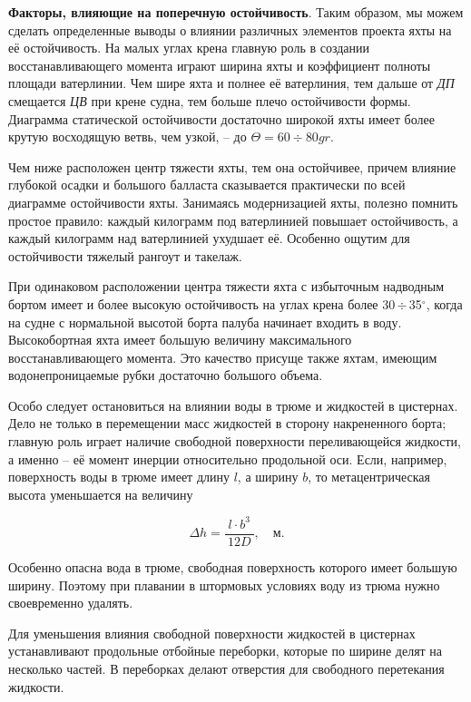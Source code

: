 \documentclass[a4paper, 12pt, twoside, final, book, russian, fittopage, cyremdash]{ncc}
\newcommand{\gr}{\ensuremath{^\circ}\xspace}
\newcommand{\otdo}{\,\ensuremath{\div}\,}
\newcommand{\motdo}{\div}
\begin{document}
\textbf{Факторы, влияющие на поперечную остойчивость}. Таким образом, мы можем сделать определенные выводы о влиянии различных элементов проекта яхты на её остойчивость. На малых углах крена главную роль в создании восстанавливающего момента играют ширина яхты и коэффициент полноты площади ватерлинии. Чем шире яхта и полнее её ватерлиния, тем дальше от \textit{ДП} смещается \textit{ЦВ} при крене судна, тем больше плечо остойчивости формы. Диаграмма статической остойчивости достаточно широкой яхты имеет более крутую восходящую ветвь, чем узкой, \--- до $\Theta = 60 \motdo 80gr$. 

Чем ниже расположен центр тяжести яхты, тем она остойчивее, причем влияние глубокой осадки и большого балласта сказывается практически по всей диаграмме остойчивости яхты. Занимаясь модернизацией яхты, полезно помнить простое правило: каждый килограмм под ватерлинией повышает остойчивость, а каждый килограмм над ватерлинией ухудшает её. Особенно ощутим для остойчивости тяжелый рангоут и такелаж.

При одинаковом расположении центра тяжести яхта с избыточным надводным бортом имеет и более высокую остойчивость на углах крена более 30\otdo 35\gr, когда на судне с нормальной высотой борта палуба начинает входить в воду. Высокобортная яхта имеет большую величину максимального восстанавливающего момента. Это качество присуще также яхтам, имеющим водонепроницаемые рубки достаточно большого объема. 

Особо следует остановиться на влиянии воды в трюме и жидкостей в цистернах. Дело не только в перемещении масс жидкостей в сторону накрененного борта; главную роль играет наличие свободной поверхности переливающейся жидкости, а именно \--- её момент инерции относительно продольной оси. Если, например, поверхность воды в трюме имеет длину $l$, а ширину $b$, то метацентрическая высота уменьшается на величину

\begin{equation}
  \Delta h = \frac{l \cdot b^3}{\ 12D\ }, \quad \text{м.}
\end{equation}

Особенно опасна вода в трюме, свободная поверхность которого имеет большую ширину. Поэтому при плавании в штормовых условиях воду из трюма нужно своевременно удалять.

Для уменьшения влияния свободной поверхности жидкостей в цистернах устанавливают продольные отбойные переборки, которые по ширине делят на несколько частей. В переборках делают отверстия для свободного перетекания жидкости.
\end{document}
